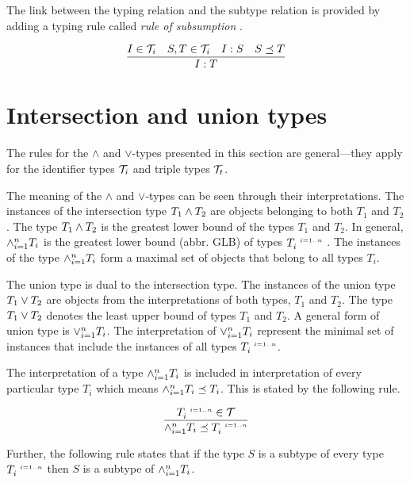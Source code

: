 \documentclass[runningheads]{llncs}
\newcommand{\s}{\scriptscriptstyle\ \,}
\newcommand{\T}{{\cal T}}
\begin{document}
The link between the typing relation and the subtype relation is
provided by adding a typing rule called \emph{rule of subsumption}
\cite{Pierce2002}.

\begin{equation}
\label{rul:typing-subsumption}
\dfrac{I\in\T_i\quad\/S,T\in\T_i\quad\/I:S\quad\/S\preceq\/T}
      {I:T}    
\end{equation}








\section{Intersection and union types\label{sec:intsc-union}}

The rules for the $\land$ and $\lor$-types presented in this section
are general---they apply for the identifier types $\T_i$ and triple
types $\T_t$.

The meaning of the $\land$ and $\lor$-types can be seen through
their interpretations. The instances of the intersection type
$T_1\land\/T_2$ are objects belonging to both $T_1$ and $T_2$. The
type $T_1\land\/T_2$ is the greatest lower bound of the types $T_1$
and $T_2$. In general, $\land_{i=1}^n\/T_i$ is the greatest lower
bound (abbr. GLB) of types $T_i^{\s\/i=1..n}$
\cite{Pierce1991,Pierce1996}. The instances of the type
$\land_{i=1}^n\/T_i$ form a maximal set of objects that belong to
all types $T_i$.

The union type is dual to the intersection type. The instances of
the union type $T_1\lor\/T_2$ are objects from the interpretations of
both types, $T_1$ and $T_2$. The type $T_1\lor\/T_2$ denotes the least
upper bound of types $T_1$ and $T_2$. A general form of union type is
$\lor_{i=1}^n\/T_i$. The interpretation of $\lor_{i=1}^n\/T_i$
represent the minimal set of instances that include the instances of
all types $T_i^{\s\/i=1..n}$.

The interpretation of a type $\land_{i=1}^n\/T_i$ is included in
interpretation of every particular type $T_i$ which means
$\land_{i=1}^n\/T_i\preceq\/T_i$. This is stated by the following
rule.

\begin{equation}
\label{rul:land-preceq-elems}
\dfrac{T_i^{\s\/i=1..n}\in\T}
      {\land_{i=1}^n\/T_i\preceq\/T_i^{\s\/i=1..n}} 
\end{equation}

Further, the following rule states that if the type $S$ is a subtype
of every type $T_i^{\s\/i=1..n}$ then $S$ is a subtype of
$\land_{i=1}^n\/T_i$.
\end{document}
